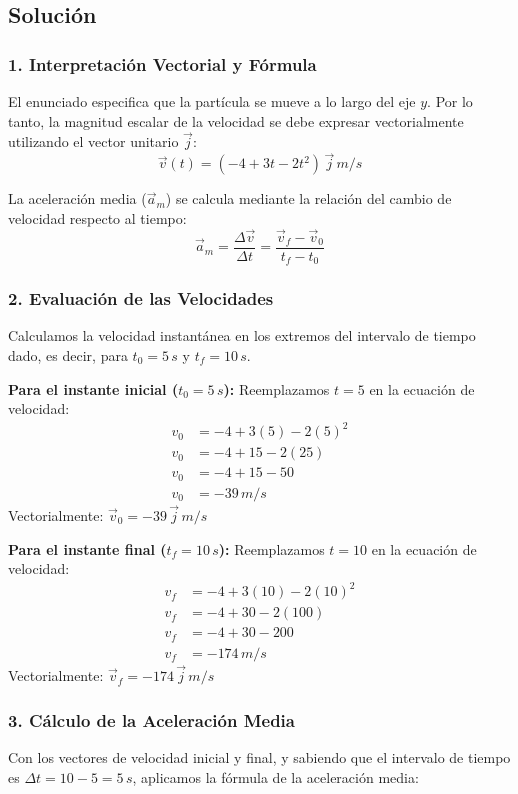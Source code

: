 \documentclass[12pt, a4paper]{article}
\begin{document}
\subsection*{Solución}

\subsubsection*{1. Interpretación Vectorial y Fórmula}
El enunciado especifica que la partícula se mueve a lo largo del eje $y$. Por lo tanto, la magnitud escalar de la velocidad se debe expresar vectorialmente utilizando el vector unitario $\vec{j}$:
$$ \vec{v}(t) = (-4 + 3t - 2t^2) \, \vec{j} \, \si{m/s} $$

La aceleración media ($\vec{a}_m$) se calcula mediante la relación del cambio de velocidad respecto al tiempo:
$$ \vec{a}_m = \frac{\Delta \vec{v}}{\Delta t} = \frac{\vec{v}_f - \vec{v}_0}{t_f - t_0} $$

\subsubsection*{2. Evaluación de las Velocidades}
Calculamos la velocidad instantánea en los extremos del intervalo de tiempo dado, es decir, para $t_0 = 5 \, \si{s}$ y $t_f = 10 \, \si{s}$.

\textbf{Para el instante inicial ($t_0 = 5 \, \si{s}$):}
Reemplazamos $t=5$ en la ecuación de velocidad:
\begin{align*}
    v_0 &= -4 + 3(5) - 2(5)^2 \\
    v_0 &= -4 + 15 - 2(25) \\
    v_0 &= -4 + 15 - 50 \\
    v_0 &= -39 \, \si{m/s}
\end{align*}
Vectorialmente: $\vec{v}_0 = -39 \, \vec{j} \, \si{m/s}$

\textbf{Para el instante final ($t_f = 10 \, \si{s}$):}
Reemplazamos $t=10$ en la ecuación de velocidad:
\begin{align*}
    v_f &= -4 + 3(10) - 2(10)^2 \\
    v_f &= -4 + 30 - 2(100) \\
    v_f &= -4 + 30 - 200 \\
    v_f &= -174 \, \si{m/s}
\end{align*}
Vectorialmente: $\vec{v}_f = -174 \, \vec{j} \, \si{m/s}$

\subsubsection*{3. Cálculo de la Aceleración Media}
Con los vectores de velocidad inicial y final, y sabiendo que el intervalo de tiempo es $\Delta t = 10 - 5 = 5 \, \si{s}$, aplicamos la fórmula de la aceleración media:
\end{document}

